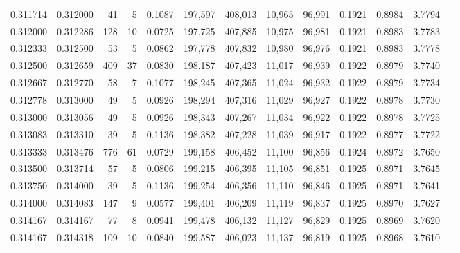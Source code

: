 \begin{tabular}{rrrrrrrrrrrrr}
0.311714 & 0.312000 &    41 &   5 &                                     0.1087 & 197,597 & 408,013 &  10,965 &  96,991 & 0.1921 & 0.8984 & 3.7794 \\
0.312000 & 0.312286 &   128 &  10 &                                     0.0725 & 197,725 & 407,885 &  10,975 &  96,981 & 0.1921 & 0.8983 & 3.7783 \\
0.312333 & 0.312500 &    53 &   5 &                                     0.0862 & 197,778 & 407,832 &  10,980 &  96,976 & 0.1921 & 0.8983 & 3.7778 \\
0.312500 & 0.312659 &   409 &  37 &                                     0.0830 & 198,187 & 407,423 &  11,017 &  96,939 & 0.1922 & 0.8979 & 3.7740 \\
0.312667 & 0.312770 &    58 &   7 &                                     0.1077 & 198,245 & 407,365 &  11,024 &  96,932 & 0.1922 & 0.8979 & 3.7734 \\
0.312778 & 0.313000 &    49 &   5 &                                     0.0926 & 198,294 & 407,316 &  11,029 &  96,927 & 0.1922 & 0.8978 & 3.7730 \\
0.313000 & 0.313056 &    49 &   5 &                                     0.0926 & 198,343 & 407,267 &  11,034 &  96,922 & 0.1922 & 0.8978 & 3.7725 \\
0.313083 & 0.313310 &    39 &   5 &                                     0.1136 & 198,382 & 407,228 &  11,039 &  96,917 & 0.1922 & 0.8977 & 3.7722 \\
0.313333 & 0.313476 &   776 &  61 &                                     0.0729 & 199,158 & 406,452 &  11,100 &  96,856 & 0.1924 & 0.8972 & 3.7650 \\
0.313500 & 0.313714 &    57 &   5 &                                     0.0806 & 199,215 & 406,395 &  11,105 &  96,851 & 0.1925 & 0.8971 & 3.7645 \\
0.313750 & 0.314000 &    39 &   5 &                                     0.1136 & 199,254 & 406,356 &  11,110 &  96,846 & 0.1925 & 0.8971 & 3.7641 \\
0.314000 & 0.314083 &   147 &   9 &                                     0.0577 & 199,401 & 406,209 &  11,119 &  96,837 & 0.1925 & 0.8970 & 3.7627 \\
0.314167 & 0.314167 &    77 &   8 &                                     0.0941 & 199,478 & 406,132 &  11,127 &  96,829 & 0.1925 & 0.8969 & 3.7620 \\
0.314167 & 0.314318 &   109 &  10 &                                     0.0840 & 199,587 & 406,023 &  11,137 &  96,819 & 0.1925 & 0.8968 & 3.7610 \\

\end{tabular}

